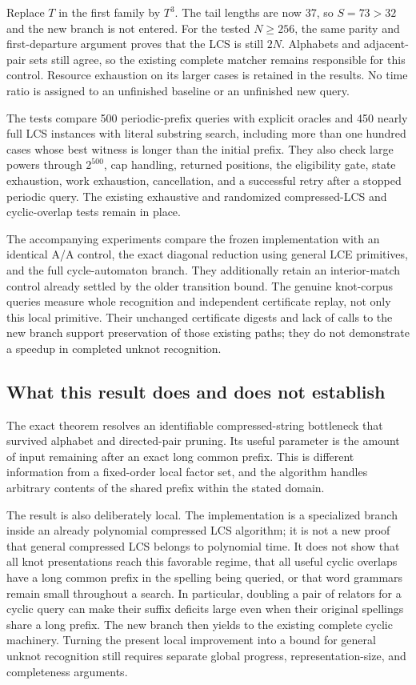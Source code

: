 \begin{example}
Replace $T$ in the first family by $T^3$. The tail lengths are now 37,
so $S=73>32$ and the new branch is not entered. For the tested
$N\ge256$, the same parity and first-departure argument proves that the
LCS is still $2N$. Alphabets and adjacent-pair sets still agree, so the
existing complete matcher remains responsible for this control.
Resource exhaustion on its larger cases is retained in the results.
No time ratio is assigned to an unfinished baseline or an unfinished
new query.
\end{example}

The tests compare 500 periodic-prefix queries with explicit oracles and
450 nearly full LCS instances with literal substring search, including
more than one hundred cases whose best witness is longer than the
initial prefix. They also check large powers through $2^{500}$,
cap handling, returned positions, the eligibility gate, state exhaustion,
work exhaustion, cancellation, and a successful retry after a stopped
periodic query. The existing exhaustive and randomized compressed-LCS
and cyclic-overlap tests remain in place.

The accompanying experiments compare the frozen implementation with an
identical A/A control, the exact diagonal reduction using general LCE
primitives, and the full cycle-automaton branch. They additionally retain
an interior-match control already settled by the older transition bound.
The genuine knot-corpus queries measure whole recognition and independent
certificate replay, not only this local primitive. Their unchanged
certificate digests and lack of calls to the new branch support
preservation of those existing paths; they do not demonstrate a speedup
in completed unknot recognition.

\subsection{What this result does and does not establish}

The exact theorem resolves an identifiable compressed-string bottleneck
that survived alphabet and directed-pair pruning. Its useful parameter is
the amount of input remaining after an exact long common prefix. This is
different information from a fixed-order local factor set, and the
algorithm handles arbitrary contents of the shared prefix within the
stated domain.

The result is also deliberately local. The implementation is a specialized
branch inside an already polynomial compressed LCS algorithm; it is not
a new proof that general compressed LCS belongs to polynomial time.
It does not show that all knot presentations reach this favorable regime,
that all useful cyclic overlaps have a long common prefix in the spelling
being queried, or that word grammars remain small throughout a search.
In particular, doubling a pair of relators for a cyclic query can make
their suffix deficits large even when their original spellings share
a long prefix. The new branch then yields to the existing complete
cyclic machinery. Turning the present local improvement into a bound
for general unknot recognition still requires separate global progress,
representation-size, and completeness arguments.
